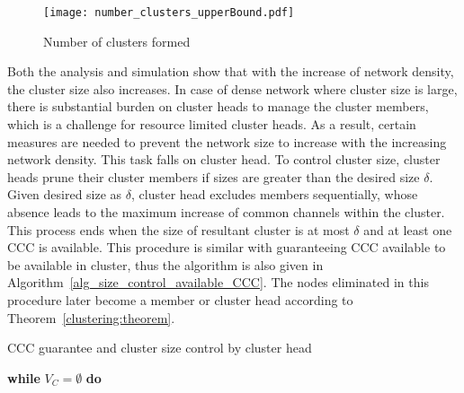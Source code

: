 \begin{figure}[h]
  \centering
  \texttt{[image: number\_clusters\_upperBound.pdf]}
  \caption{Number of clusters formed}
  \label{number_clusters_scale}
\end{figure}

Both the analysis and simulation show that with the increase of network density, the cluster size also increases.
In case of dense network where cluster size is large, there is substantial burden on cluster heads to manage the cluster members, which is a challenge for resource limited cluster heads.
As a result, certain measures are needed to prevent the network size to increase with the increasing network density.
This task falls on cluster head.
To control cluster size, cluster heads prune their cluster members if sizes are greater than the desired size $\delta$.
Given desired size as $\delta$, cluster head excludes members sequentially, whose absence leads to the maximum increase of common channels within the cluster.
This process ends when the size of resultant cluster is at most $\delta$ and at least one \gls{CCC} is available.
This procedure is similar with guaranteeing CCC available to be available in cluster, thus the algorithm is also given in Algorithm~\ref{alg_size_control_available_CCC}.
The nodes eliminated in this procedure later become a member or cluster head according to Theorem~\ref{clustering:theorem}.


\begin{algorithm}               %
\caption{CCC guarantee and cluster size control by cluster head}          %
\label{alg_size_control_available_CCC}
\DontPrintSemicolon
\SetAlgoLined
{}
\textbf{while} $V_C =\emptyset$ \textbf{do}\\
\end{algorithm}

